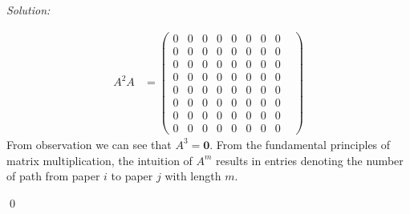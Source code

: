 \documentclass[12pt]{article}
\newenvironment{sol}
    {\emph{Solution:}
    }
    {
    \qed
    }
\begin{document}
\begin{sol}
\begin{align*}
		A^2A &= \begin{pmatrix}0 & 0 & 0 & 0 & 0 & 0 & 0 & 0 \\ 0 & 0 & 0 & 0 & 0 & 0 & 0 & 0 & \\ 0 & 0 & 0 & 0 & 0 & 0 & 0 & 0 \\ 0 & 0 & 0 & 0 & 0 & 0 & 0 & 0 \\ 0 & 0 & 0 & 0 & 0 & 0 & 0 & 0 \\ 0 & 0 & 0 & 0 & 0 & 0 & 0 & 0 \\ 0 & 0 & 0 & 0 & 0 & 0 & 0 & 0 \\ 0 & 0 & 0 & 0 & 0 & 0 & 0 & 0\end{pmatrix}
	\end{align*}
	From observation we can see that $A^3 = \textbf{0}$. From the fundamental principles of matrix multiplication, the intuition of $A^m$ results in entries denoting the number of path from paper $ i $ to paper $ j $ with length $ m $.
\end{sol}
\end{document}
